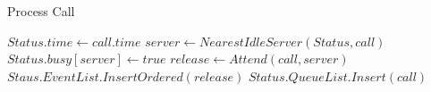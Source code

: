 \begin{algorithm}
  \hline \vspace{3pt}
  \caption{Process Call}\label{proc_call}
  \vspace{3pt} \hline
  \begin{algorithmic}[0]
    \State $Status.time \gets call.time$
    \State $server \gets NearestIdleServer(Status,call)$
    \State $Status.busy[server] \gets true$
    \State $release \gets Attend(call,server)$
    \State $Staus.EventList.InsertOrdered(release)$
    \Else
    \State $Status.QueueList.Insert(call)$
    \EndIf
    \EndProcedure
    \hline
  \end{algorithmic}
\end{algorithm}
